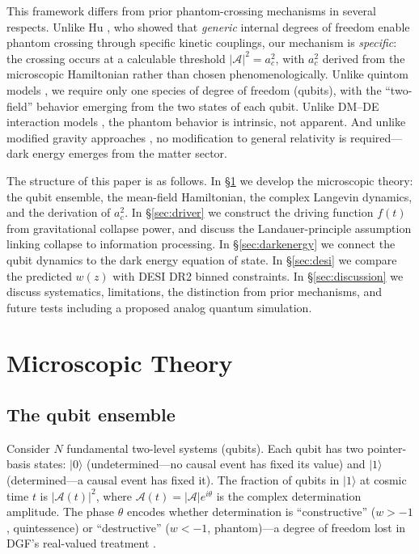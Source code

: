\documentclass[aps,prd,twocolumn,superscriptaddress]{revtex4-2}
\begin{document}
This framework differs from prior phantom-crossing mechanisms in several respects. Unlike Hu \cite{Hu:2005}, who showed that \emph{generic} internal degrees of freedom enable phantom crossing through specific kinetic couplings, our mechanism is \emph{specific}: the crossing occurs at a calculable threshold $|\mathcal{A}|^2 = a_c^2$, with $a_c^2$ derived from the microscopic Hamiltonian rather than chosen phenomenologically. Unlike quintom models \cite{Feng:2005}, we require only one species of degree of freedom (qubits), with the ``two-field'' behavior emerging from the two states of each qubit. Unlike DM--DE interaction models \cite{Khoury:2025}, the phantom behavior is intrinsic, not apparent. And unlike modified gravity approaches \cite{Linder:2025}, no modification to general relativity is required---dark energy emerges from the matter sector.

The structure of this paper is as follows. In \S\ref{sec:theory} we develop the microscopic theory: the qubit ensemble, the mean-field Hamiltonian, the complex Langevin dynamics, and the derivation of $a_c^2$. In \S\ref{sec:driver} we construct the driving function $f(t)$ from gravitational collapse power, and discuss the Landauer-principle assumption linking collapse to information processing. In \S\ref{sec:darkenergy} we connect the qubit dynamics to the dark energy equation of state. In \S\ref{sec:desi} we compare the predicted $w(z)$ with DESI DR2 binned constraints. In \S\ref{sec:discussion} we discuss systematics, limitations, the distinction from prior mechanisms, and future tests including a proposed analog quantum simulation.

\section{Microscopic Theory}
\label{sec:theory}

\subsection{The qubit ensemble}

Consider $N$ fundamental two-level systems (qubits). Each qubit has two pointer-basis states: $|0\rangle$ (undetermined---no causal event has fixed its value) and $|1\rangle$ (determined---a causal event has fixed it). The fraction of qubits in $|1\rangle$ at cosmic time $t$ is $|\mathcal{A}(t)|^2$, where $\mathcal{A}(t) = |\mathcal{A}|e^{i\theta}$ is the complex determination amplitude. The phase $\theta$ encodes whether determination is ``constructive'' ($w > -1$, quintessence) or ``destructive'' ($w < -1$, phantom)---a degree of freedom lost in DGF's real-valued treatment \cite{DGF:2024}.
\end{document}
